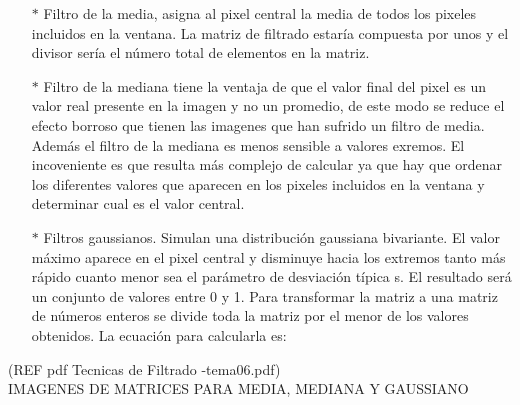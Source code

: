\begin{itemize}
	\item[$*$] Filtro de la media, asigna al pixel central la media de todos los pixeles incluidos en la ventana. La matriz de filtrado estaría compuesta por unos y el divisor sería el número total de elementos en la matriz.					\item[$*$] Filtro de la mediana tiene la ventaja de que el valor final del pixel es un valor real presente en la imagen y no un promedio, de este modo se reduce el efecto borroso que tienen las imagenes que han sufrido un filtro de media. Además el filtro de la mediana es menos sensible a valores exremos. El incoveniente es que resulta más complejo de calcular ya que hay que ordenar los diferentes valores que aparecen en los pixeles incluidos en la ventana y determinar cual es el valor central.
	\item[$*$]Filtros gaussianos. Simulan una distribución gaussiana bivariante. El valor máximo aparece en el pixel central y disminuye hacia los extremos tanto más rápido cuanto menor sea el parámetro de desviación típica s. El resultado será un conjunto de valores entre 0 y 1. Para transformar la matriz a una matriz de números enteros se divide toda la matriz por el menor de los valores obtenidos. La ecuación para calcularla es:
\end{itemize}

(REF pdf Tecnicas de Filtrado -tema06.pdf)\\

IMAGENES DE MATRICES PARA MEDIA, MEDIANA Y GAUSSIANO\\

